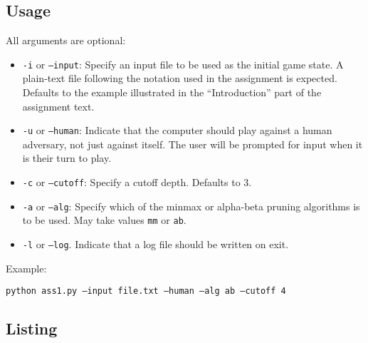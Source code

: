 \documentclass[letterpaper, 12pt]{article}
\numberwithin{theorem}{section}
\begin{document}
\subsection{Usage}
All arguments are optional:
\begin{itemize}
	\item \texttt{-i} or \texttt{--input}: Specify an input file to be used as the initial game state. A plain-text file following the notation used in the assignment is expected. Defaults to the example illustrated in the ``Introduction'' part of the assignment text.
	\item \texttt{-u} or \texttt{--human}: Indicate that the computer should play against a human adversary, not just against itself. The user will be prompted for input when it is their turn to play.
	\item \texttt{-c} or \texttt{--cutoff}: Specify a cutoff depth. Defaults to 3.
	\item \texttt{-a} or \texttt{--alg}: Specify which of the minmax or alpha-beta pruning algorithms is to be used. May take values \texttt{mm} or \texttt{ab}.
	\item \texttt{-l} or \texttt{--log}. Indicate that a log file should be written on exit.
\end{itemize}
Example:

\texttt{python ass1.py --input file.txt --human --alg ab --cutoff 4}

\subsection{Listing}

\end{document}
